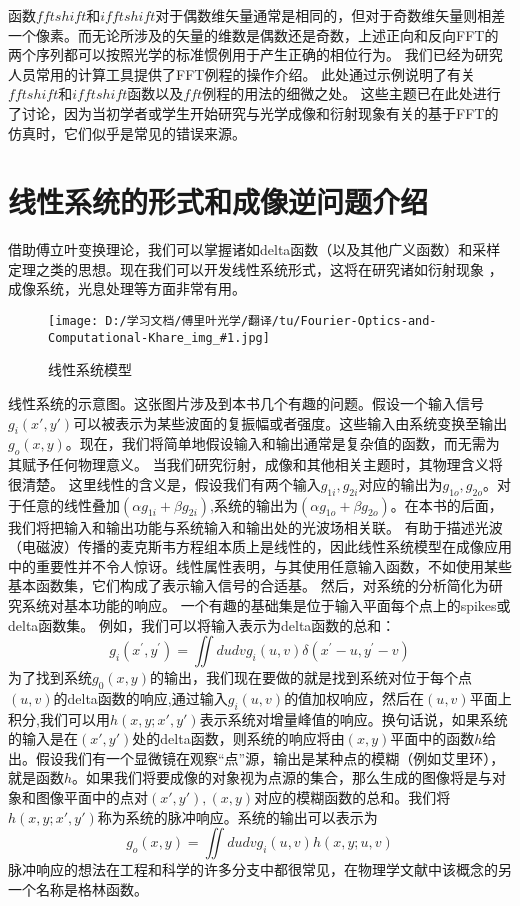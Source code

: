 \documentclass[12pt, UTF8]{ctexart}%
\numberwithin{equation}{section}
\numberwithin{figure}{section}
\newcommand {\InsertPic}[3]{\begin{figure}[htbp]\centering \texttt{[image: D:/学习文档/傅里叶光学/翻译/tu/Fourier-Optics-and-Computational-Khare\_img\_\#1.jpg]}\caption{#3}  \label{#2}\end{figure}}%
\def\Emphasize#1{\textcolor[rgb]{1,0,0}{#1}}
\newcommand{\InsertEqution}[2]{\begin{equation}
  \label{#1}
   #2
 \end{equation}}
\newcommand{\InsertInlineEq}[1]{$#1$}
\begin{document}
\begin{sloppypar}
  函数\InsertInlineEq{fftshift}和\InsertInlineEq{ifftshift}对于偶数维矢量通常是相同的，但对于奇数维矢量则相差一个像素。而无论所涉及的矢量的维数是偶数还是奇数，上述正向和反向FFT的两个序列都可以按照光学的标准惯例用于产生正确的相位行为。
  我们已经为研究人员常用的计算工具提供了FFT例程的操作介绍。 此处通过示例说明了有关\InsertInlineEq{fftshift}和\InsertInlineEq{ifftshift}函数以及\InsertInlineEq{fft}例程的用法的细微之处。 这些主题已在此处进行了讨论，因为当初学者或学生开始研究与光学成像和衍射现象有关的基于FFT的仿真时，它们似乎是常见的错误来源。

\section{线性系统的形式和成像逆问题介绍}
借助傅立叶变换理论，我们可以掌握诸如delta函数（以及其他广义函数）和采样定理之类的思想。现在我们可以开发线性系统形式，这将在研究诸如衍射现象 ，成像系统，光息处理等方面非常有用。\InsertPic{19}{F5.1}{线性系统模型}线性系统的示意图。这张图片涉及到本书几个有趣的问题。假设一个输入信号\InsertInlineEq{g_i(x',y')}可以被表示为某些波面的复振幅或者强度。这些输入由系统变换至输出\InsertInlineEq{g_o(x,y)}。现在，我们将简单地假设输入和输出通常是复杂值的函数，而无需为其赋予任何物理意义。 当我们研究衍射，成像和其他相关主题时，其物理含义将很清楚。
这里线性的含义是，假设我们有两个输入\InsertInlineEq{g_{1i},g_{2i}}对应的输出为\InsertInlineEq{g_{1o},g_{2o}}。对于任意的线性叠加\InsertInlineEq{(\alpha g_{1i}+\beta g_{2i})},系统的输出为\InsertInlineEq{(\alpha g_{1o}+\beta g_{2o})}。在本书的后面，我们将把输入和输出功能与系统输入和输出处的光波场相关联。 有助于描述光波（电磁波）传播的麦克斯韦方程组本质上是线性的，因此线性系统模型在成像应用中的重要性并不令人惊讶。线性属性表明，\Emphasize{与其使用任意输入函数，不如使用某些基本函数集，它们构成了表示输入信号的合适基。} 然后，对系统的分析简化为研究系统对基本功能的响应。
一个有趣的基础集是位于输入平面每个点上的spikes或delta函数集。 例如，我们可以将输入表示为delta函数的总和：
\InsertEqution{5.1}{g_{i}\left(x^{\prime}, y^{\prime}\right)=\iint d u d v g_{i}(u, v) \delta\left(x^{\prime}-u, y^{\prime}-v\right)}
为了找到系统\InsertInlineEq{g_0(x,y)}的输出，我们现在要做的就是找到系统对位于每个点\InsertInlineEq{(u,v)}的delta函数的响应,通过输入\InsertInlineEq{g_i(u,v)}的值加权响应，然后在\InsertInlineEq{(u,v)}平面上积分,我们可以用\InsertInlineEq{h(x,y;x',y')}表示系统对增量峰值的响应。换句话说，如果系统的输入是在\InsertInlineEq{(x',y')}处的delta函数，则系统的响应将由\InsertInlineEq{(x,y)}平面中的函数\InsertInlineEq{h}给出。假设我们有一个显微镜在观察“点”源，输出是某种点的模糊（例如艾里环），就是函数\InsertInlineEq{h}。如果我们将要成像的对象视为点源的集合，那么生成的图像将是与对象和图像平面中的点对\InsertInlineEq{(x',y'),(x,y)}对应的模糊函数的总和。我们将\InsertInlineEq{h(x,y;x',y')}称为系统的脉冲响应。系统的输出可以表示为\InsertEqution{5.2}{g_{o}(x, y)=\iint d u d v g_{i}(u, v) h(x, y ; u, v)}
脉冲响应的想法在工程和科学的许多分支中都很常见，在物理学文献中该概念的另一个名称是格林函数。

\end{sloppypar}
\end{document}
